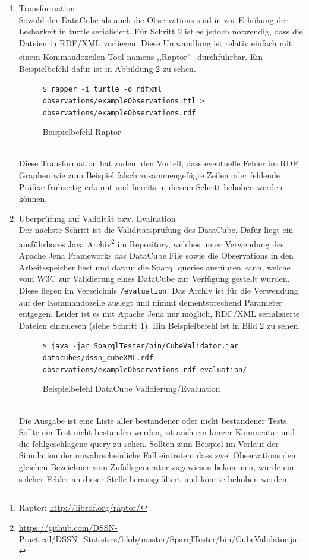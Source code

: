 \documentclass{article}
\begin{document}
\begin{enumerate}
	\item{Transformation\\
	Sowohl der DataCube als auch die Observations sind in zur Erhöhung der Lesbarkeit in turtle serialisiert. Für Schritt 2 ist es jedoch notwendig, dass die Dateien in RDF/XML vorliegen. Diese Umwandlung ist relativ einfach mit einem Kommandozeilen Tool namens ,,Raptor''\footnote{Raptor: \url{http://librdf.org/raptor/}} durchführbar. Ein Beispielbefehl dafür ist in Abbildung 2 zu sehen.\\
	\begin{figure}[h]
	\centering
	\texttt{\$ rapper -i turtle -o rdfxml observations/exampleObservations.ttl  > observations/exampleObservations.rdf}
	\caption{Beispielbefehl Raptor}
	\end{figure}
	}\\
	Diese Transformation hat zudem den Vorteil, dass eventuelle Fehler im RDF Graphen wie zum Beispiel falsch zusammengefügte Zeilen oder fehlende Präfixe frühzeitig erkannt und bereits in diesem Schritt behoben werden können.\\
	\item{Überprüfung auf Validität bzw. Evaluation\\
	Der nächste Schritt ist die Validitätsprüfung des DataCube. Dafür liegt ein ausführbares Java Archiv\footnote{\url{https://github.com/DSSN-Practical/DSSN_Statistics/blob/master/SparqlTester/bin/CubeValidator.jar}} im Repository, welches unter Verwendung des Apache Jena Frameworks das DataCube File sowie die Observations in den Arbeitsspeicher liest und darauf die Sparql queries ausführen kann, welche vom W3C zur Validierung eines DataCube zur Verfügung gestellt wurden. Diese liegen im Verzeichnis \texttt{/evaluation}. Das Archiv ist für die Verwendung auf der Kommandozeile auslegt und nimmt dementsprechend Parameter entgegen. Leider ist es mit Apache Jena nur möglich, RDF/XML serialisierte Dateien einzulesen (siehe Schritt 1). Ein Beispielbefehl ist in Bild 2 zu sehen.\\
	\begin{figure}[h]
	\centering
	\texttt{\$ java -jar SparqlTester/bin/CubeValidator.jar datacubes/dssn\_cubeXML.rdf observations/exampleObservations.rdf evaluation/}
	\caption{Beispielbefehl DataCube Validierung/Evaluation}
	\end{figure}\\
	Die Ausgabe ist eine Liste aller bestandener oder nicht bestandener Tests. Sollte ein Test nicht bestanden werden, ist auch ein kurzer Kommentar und die fehlgeschlagene query zu sehen. Sollten zum Beispiel im Verlauf der Simulation der unwahrscheinliche Fall eintreten, dass zwei Observations den gleichen Bezeichner vom Zufallsgenerator zugewiesen bekommen, würde ein solcher Fehler an dieser Stelle herausgefiltert und könnte behoben werden.
}
\end{enumerate}
\end{document}
